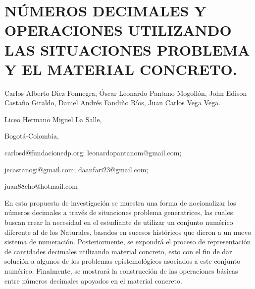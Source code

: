 \section{NÚMEROS DECIMALES Y OPERACIONES UTILIZANDO LAS SITUACIONES PROBLEMA
Y EL MATERIAL CONCRETO.}

\begin{datos}

Carlos Alberto Diez Fonnegra, Óscar Leonardo Pantano Mogollón, John
Edison Castaño Giraldo, Daniel Andrés Fandiño Ríos, Juan Carlos Vega
Vega. 

Liceo Hermano Miguel La Salle,

Bogotá-Colombia,

carlosd@fundacionedp.org; leonardopantanom@gmail.com;

jecastanogi@gmail.com; daanfari23@gmail.com;

juan88cho@hotmail.com

\end{datos}

En esta propuesta de investigación se muestra una forma de nocionalizar
los números decimales a través de situaciones problema generatrices,
las cuales buscan crear la necesidad en el estudiante de utilizar
un conjunto numérico diferente al de los Naturales, basados en sucesos
históricos que dieron a un nuevo sistema de numeración. Posteriormente,
se expondrá el proceso de representación de cantidades decimales utilizando
material concreto, esto con el fin de dar solución a algunos de los
problemas epistemológicos asociados a este conjunto numérico. Finalmente,
se mostrará la construcción de las operaciones básicas entre números
decimales apoyados en el material concreto.

